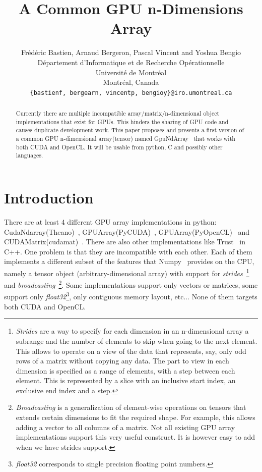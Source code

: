 \documentclass{article} %
\title{A Common GPU n-Dimensions Array}
\author{
Frédéric Bastien, Arnaud Bergeron, Pascal Vincent and Yoshua Bengio \\
D\'epartement d'Informatique et de Recherche Op\'erationnelle\\
Universit\'e de Montr\'eal\\
Montr\'eal, Canada \\
\texttt{\{bastienf, bergearn, vincentp, bengioy\}@iro.umontreal.ca} \\
}
\begin{document}
\maketitle

\begin{abstract}
Currently there are multiple incompatible array/matrix/n-dimensional object implementations that exist for GPUs. 
This hinders the sharing of GPU code and causes duplicate development work.
This paper proposes and presents a first version of a common GPU n-dimensional array(tensor) named GpuNdArray~\citep{GpuNdArray} that works with both CUDA and OpenCL.
It will be usable from python, C and possibly other languages.
\end{abstract}

\section{Introduction}
There are at least 4 different GPU array implementations in
python: CudaNdarray(Theano)~\citep{bergstra+al:2010-scipy},
GPUArray(PyCUDA)~\citep{kloeckner_pycuda_2009},
GPUArray(PyOpenCL)~\citep{kloeckner_pycuda_2009} and
CUDAMatrix(cudamat)~\citep{cudamat-TR2009}. 
There are also other implementations like Trust~\citep{Thrust} in C++. 
One problem is that they are incompatible with each other. 
Each of them implements a different subset of the features that Numpy~\citep{numpy-2007} provides on the CPU, namely a tensor object (arbitrary-dimensional array) with support for \emph{strides}~\footnote{
\emph{Strides} are a way to specify for each dimension in an n-dimensional array a subrange and the number of elements to skip when going
to the next element. 
This allows to operate on a view of the data that represents, say, only odd rows of a matrix without copying any data.
The part to view in each dimension is specified as a range of elements, with a step between each element.
This is represented by a slice with an inclusive start index, an exclusive end index and a step.
}
and \emph{broadcasting}~\footnote{
\emph{Broadcasting} is a generalization of element-wise operations on tensors that extends certain dimensions to fit the required shape.
For example, this allows adding a vector to all columns of a matrix.
Not all existing GPU array implementations support this very useful construct.
It is however easy to add when we have strides support.
}.
Some implementations support only vectors or matrices, some support only \emph{float32}\footnote{
\emph{float32} corresponds to single precision floating point numbers.
}, only contiguous memory layout, etc$\ldots$
None of them targets both CUDA and OpenCL.
\end{document}
